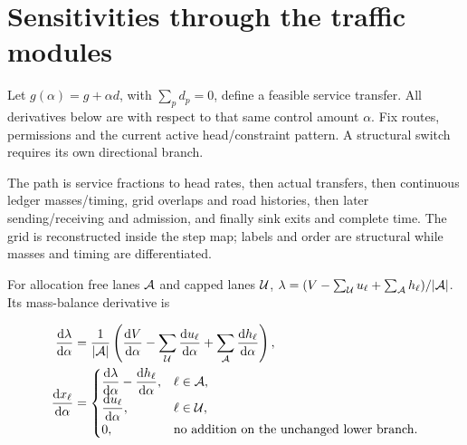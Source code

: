 \documentclass[10pt,a4paper]{article}
\newenvironment{revision}{\begingroup\color{revisionred}}{\par\endgroup}
\begin{document}
\begin{revision}
\section{Sensitivities through the traffic modules}
Let $g(\alpha)=g+\alpha d$, with $\sum_p d_p=0$, define a feasible
service transfer. All derivatives below are with respect to that same
control amount $\alpha$. Fix routes, permissions and the current active
head/constraint pattern. A structural switch requires its own directional
branch.

The path is service fractions to head rates, then actual transfers, then
continuous ledger masses/timing, grid overlaps and road histories, then
later sending/receiving and admission, and finally sink exits and complete
time. The grid is reconstructed inside the step map; labels and order are
structural while masses and timing are differentiated.

For allocation free lanes ${\cal A}$ and capped lanes ${\cal U}$,
$\lambda=(V-\sum_{\cal U}u_\ell+\sum_{\cal A}h_\ell)/|{\cal A}|$.
Its mass-balance derivative is

\begin{align}
 \frac{\mathrm d\lambda}{\mathrm d\alpha}
 &=\frac1{|{\cal A}|}\left(
 \frac{\mathrm dV}{\mathrm d\alpha}
 -\sum_{\cal U}\frac{\mathrm du_\ell}{\mathrm d\alpha}
 +\sum_{\cal A}\frac{\mathrm dh_\ell}{\mathrm d\alpha}\right),\nonumber\\
 \frac{\mathrm dx_\ell}{\mathrm d\alpha}
 &=\begin{cases}
 \displaystyle\frac{\mathrm d\lambda}{\mathrm d\alpha}
             -\frac{\mathrm dh_\ell}{\mathrm d\alpha},&\ell\in{\cal A},\\
 \displaystyle\frac{\mathrm du_\ell}{\mathrm d\alpha},&\ell\in{\cal U},\\
 0,&\text{no addition on the unchanged lower branch}.
 \end{cases}
 \label{eq:allocation-derivative}
\end{align}


\end{revision}
\end{document}

